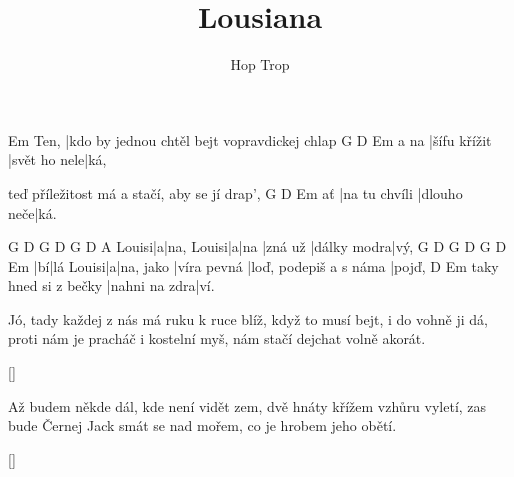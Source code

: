 \documentclass{song}
\title{Lousiana}
\author{Hop Trop}
\begin{document}
\strophe
     Em
Ten, |kdo by jednou chtěl bejt vopravdickej chlap
     G            D            Em
a na |šífu křížit |svět ho nele|ká,

teď příležitost má a stačí, aby se jí drap',
   G             D           Em
ať |na tu chvíli |dlouho neče|ká.
\endstrophe

      G D          G D   G       D           A
Louisi|a|na, Louisi|a|na |zná už |dálky modra|vý,
G  D         G D         G           D                      Em
|bí|lá Louisi|a|na, jako |víra pevná |loď, podepiš a s náma |pojď,
				     D             Em
taky hned si z bečky |nahni na zdra|ví.
\endstrophe

\strophe*
Jó, tady každej z nás má ruku k ruce blíž,
když to musí bejt, i do vohně ji dá,
proti nám je pracháč i kostelní myš,
nám stačí dejchat volně akorát.
\endstrophe

\ref{}

\strophe*
Až budem někde dál, kde není vidět zem,
dvě hnáty křížem vzhůru vyletí,
zas bude Černej Jack smát se nad mořem,
co je hrobem jeho obětí.
\endstrophe

\ref{}
\end{document}

